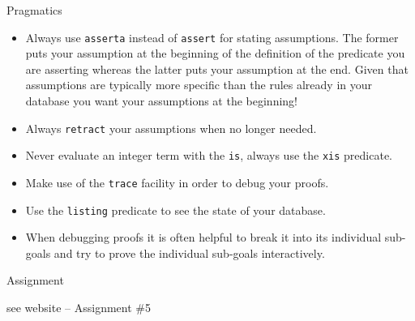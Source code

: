 \documentclass{beamer}
\begin{document}
\begin{frame}[fragile]{Pragmatics}
\small
\begin{itemize}
\item Always use {\tt asserta} instead of {\tt assert} for stating assumptions.  The former puts your assumption at the beginning of the definition of the predicate you are asserting whereas the latter puts your 
assumption at the end.  Given that assumptions are typically more specific than the rules already in your database you want your assumptions at the beginning!

\item Always {\tt retract} your assumptions when no longer needed.

\item Never evaluate an integer term with the {\tt is}, always use the {\tt xis} predicate.  

\item Make use of the {\tt trace} facility in order to debug your proofs.

\item Use the {\tt listing} predicate to see the state of your database.

\item When debugging proofs it is often helpful to break it into its individual sub-goals and try to
prove the individual sub-goals interactively.

\end{itemize}
\end{frame}

\begin{frame}[fragile]{Assignment}

see website -- Assignment \#5
\end{frame}
\end{document}
